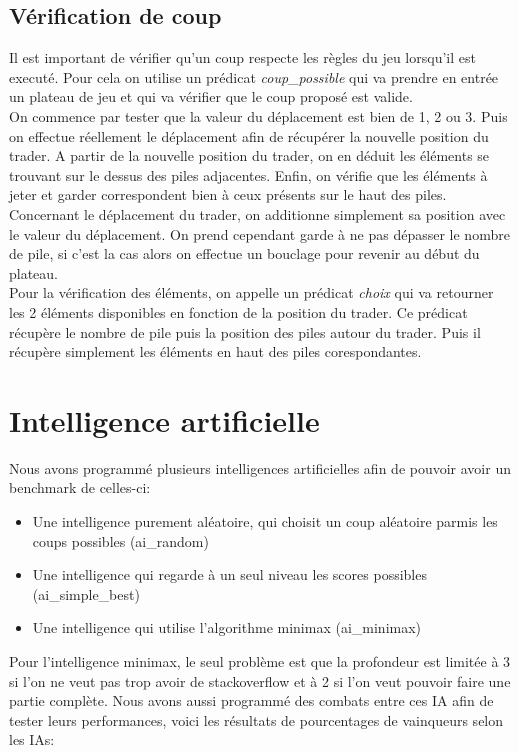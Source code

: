 \documentclass[11pt,a4paper,twoside,french,svgnames]{report}
\begin{document}
\begin{center}
\subsection{Vérification de coup}
Il est important de vérifier qu'un coup respecte les règles du jeu lorsqu'il est executé. Pour cela on utilise un prédicat \textit{coup\_possible} qui va prendre en entrée un plateau de jeu et qui va vérifier que le coup proposé est valide. \\
On commence par tester que la valeur du déplacement est bien de 1, 2 ou 3. Puis on effectue réellement le déplacement afin de récupérer la nouvelle position du trader. A partir de la nouvelle position du trader, on en déduit les éléments se trouvant sur le dessus des piles adjacentes. Enfin, on vérifie que les éléments à jeter et garder correspondent bien à ceux présents sur le haut des piles.\\
Concernant le déplacement du trader, on additionne simplement sa position avec le valeur du déplacement. On prend cependant garde à ne pas dépasser le nombre de pile, si c'est la cas alors on effectue un bouclage pour revenir au début du plateau.\\
Pour la vérification des éléments, on appelle un prédicat \textit{choix} qui va retourner les 2 éléments disponibles en fonction de la position du trader. Ce prédicat récupère le nombre de pile puis la position des piles autour du trader. Puis il récupère simplement les éléments en haut des piles corespondantes.

\section{Intelligence artificielle}
Nous avons programmé plusieurs intelligences artificielles afin de pouvoir avoir un benchmark de celles-ci:
\begin{itemize}
    \item Une intelligence purement aléatoire, qui choisit un coup aléatoire parmis les coups possibles (ai\_random)
    \item Une intelligence qui regarde à un seul niveau les scores possibles (ai\_simple\_best)
    \item Une intelligence qui utilise l'algorithme minimax (ai\_minimax)
\end{itemize}

Pour l'intelligence minimax, le seul problème est que la profondeur est limitée à 3 si l'on ne veut pas trop avoir de stackoverflow et à 2 si l'on veut pouvoir faire une partie complète.
Nous avons aussi programmé des combats entre ces IA afin de tester leurs performances, voici les résultats de pourcentages de vainqueurs selon les IAs:


\end{center}
\end{document}
